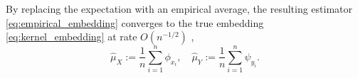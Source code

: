 \documentclass[twoside]{article} \usepackage{aistats2017}
\theoremstyle{definition}
\theoremstyle{theorem}
\newcommand{\rv}[1]{{#1}}
\newcommand{\inner}[2]{{\langle #1, #2 \rangle}}
\newcommand{\hatmuX}{\hat{\mu}_{\rv{X}}}
\newcommand{\hatmuY}{\hat{\mu}_{\rv{Y}}}
\begin{document}
			By replacing the expectation with an empirical average, the resulting estimator \eqref{eq:empirical_embedding} converges to the true embedding \eqref{eq:kernel_embedding} at rate $O(n^{-1/2})$ \citep{smola2007hilbert},
			\begin{equation}
				\hatmuX := \frac{1}{n} \sum_{i = 1}^{n} \phi_{x_{i}} ,\quad \hatmuY := \frac{1}{n} \sum_{i = 1}^{n} \psi_{y_{i}}.
			\label{eq:empirical_embedding}
			\end{equation}

%
\end{document}
